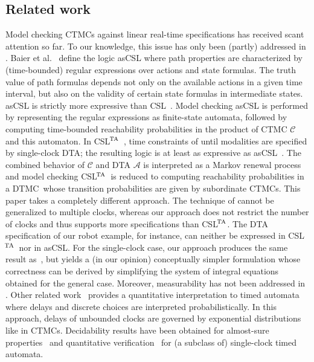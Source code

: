 \documentclass{LMCS}
\newcommand{\mc}[1]{\mathcal{#1}}
\newcommand{\<}{\langle}
\renewcommand{\>}{\rangle}
\newcommand{\mC}{\mathcal{C}}
\newcommand{\mA}{\mathcal{A}}
\newcommand{\CSLTA}{\CSL$^{\!\textrm{\uppercase{TA}}}$}
\newcommand{\CTMC}{\textsc{{CTMC}}}
\newcommand{\DTA}{\textsc{DTA}}
\newcommand{\DTMC}{\textsc{DTMC}}
\newcommand{\CSL}{\textsc{CSL}}
\begin{document}
\subsection*{Related work}
Model checking CTMCs against linear real-time specifications has received scant attention
so far.
To our knowledge, this issue has only been (partly) addressed in \cite{DHS09,BCHKS07}.
Baier et al.~\cite{BCHKS07} define the logic asCSL where path properties are characterized
by (time-bounded) regular expressions over actions and state formulas.
The truth value of path formulas depends not only on the available actions in a given time
interval, but also on the validity of certain state formulas in intermediate states.
asCSL is strictly more expressive than CSL~\cite{BCHKS07}.
Model checking asCSL is performed by representing the regular expressions as finite-state
automata, followed by computing time-bounded reachability probabilities in the product
of CTMC $\mc{C}$ and this automaton.
In \CSLTA~\cite{DHS09}, time constraints of until modalities are specified by single-clock
\DTA; the resulting logic is at least as expressive as asCSL~\cite{DHS09}.
The combined behavior of $\mC$ and DTA $\mA$ is interpreted as a Markov renewal process
and model checking \CSLTA\ is reduced to computing reachability probabilities in a \DTMC\
whose transition probabilities are given by subordinate \CTMC s.
This paper takes a completely different approach.
The technique of \cite{DHS09} cannot be generalized to multiple clocks, whereas our approach
does not restrict the number of clocks and thus supports more specifications than \CSLTA.
The DTA specification of our robot example, for instance, can neither be expressed in \CSLTA\
nor in asCSL.
For the single-clock case, our approach produces the same result as~\cite{DHS09}, but
yields a (in our opinion) conceptually simpler formulation whose correctness can be
derived by simplifying the system of integral equations obtained for the general case.
Moreover, measurability has not been addressed in \cite{DHS09}.
Other related work~\cite{BBBBG07,BBBBG08,BBBM08} provides a quantitative interpretation
to timed automata where delays and discrete choices are interpreted probabilistically.
In this approach, delays of unbounded clocks are governed by exponential distributions
like in \CTMC s.
Decidability results have been obtained for almost-sure properties~\cite{BBBBG08} and
quantitative verification~\cite{BBBM08} for (a subclass of) single-clock timed automata.
\end{document}
